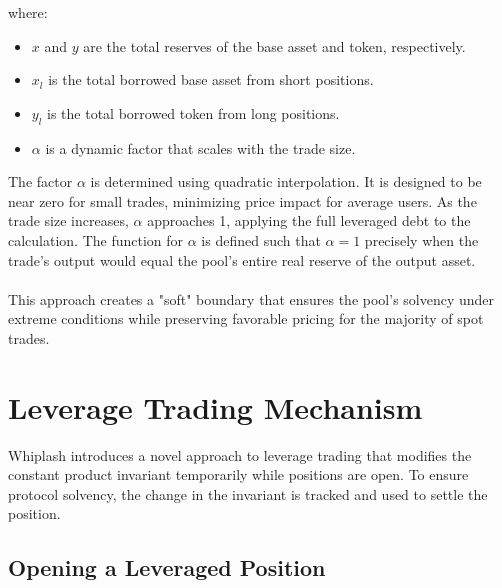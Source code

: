 \documentclass[11pt]{article}
\begin{document}
where:
\begin{itemize}
    \item $x$ and $y$ are the total reserves of the base asset and token, respectively.
    \item $x_l$ is the total borrowed base asset from short positions.
    \item $y_l$ is the total borrowed token from long positions.
    \item $\alpha$ is a dynamic factor that scales with the trade size.
\end{itemize}

The factor $\alpha$ is determined using quadratic interpolation. It is designed to be near zero for small trades, minimizing price impact for average users. As the trade size increases, $\alpha$ approaches 1, applying the full leveraged debt to the calculation. The function for $\alpha$ is defined such that $\alpha=1$ precisely when the trade's output would equal the pool's entire real reserve of the output asset.
\\\\
This approach creates a "soft" boundary that ensures the pool's solvency under extreme conditions while preserving favorable pricing for the majority of spot trades.

\section{Leverage Trading Mechanism}

Whiplash introduces a novel approach to leverage trading that modifies the constant product invariant temporarily while positions are open. To ensure protocol solvency, the change in the invariant is tracked and used to settle the position.

\subsection{Opening a Leveraged Position}
\end{document}

